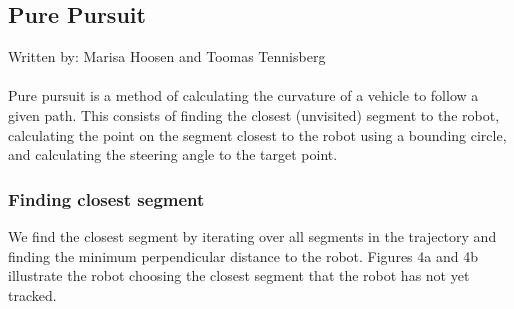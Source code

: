 \documentclass{article}
\begin{document}
\subsection{Pure Pursuit}
Written by: Marisa Hoosen and Toomas Tennisberg\\\\
Pure pursuit is a method of calculating the curvature of a vehicle to follow a given path. This consists of finding the closest (unvisited) segment to the robot, calculating the point on the segment closest to the robot using a bounding circle, and calculating the steering angle to the target point.

\subsubsection{Finding closest segment}
We find the closest segment by iterating over all segments in the trajectory and finding the minimum perpendicular distance to the robot. Figures 4a and 4b illustrate the robot choosing the closest segment that the robot has not yet tracked.\\
\end{document}
